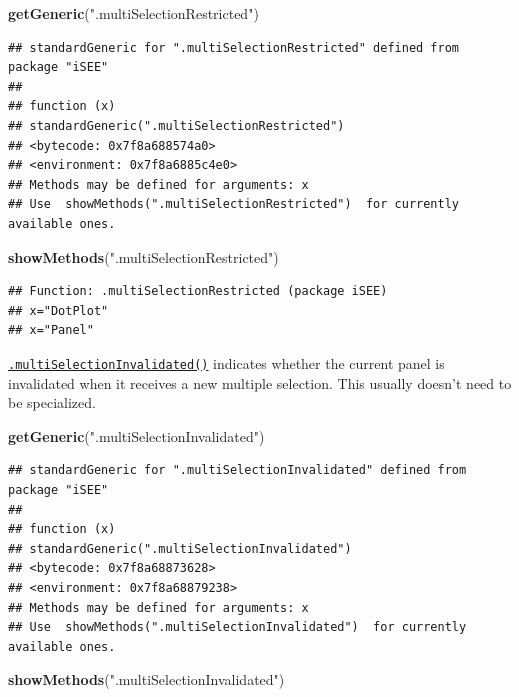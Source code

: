 \documentclass[
]{book}
\newenvironment{Shaded}{\begin{snugshade}}{\end{snugshade}}
\newcommand{\KeywordTok}[1]{\textcolor[rgb]{0.13,0.29,0.53}{\textbf{#1}}}
\newcommand{\NormalTok}[1]{#1}
\newcommand{\StringTok}[1]{\textcolor[rgb]{0.31,0.60,0.02}{#1}}
\begin{document}
\begin{Shaded}
\begin{Highlighting}[]
\KeywordTok{getGeneric}\NormalTok{(}\StringTok{".multiSelectionRestricted"}\NormalTok{)}
\end{Highlighting}
\end{Shaded}

\begin{verbatim}
## standardGeneric for ".multiSelectionRestricted" defined from package "iSEE"
## 
## function (x) 
## standardGeneric(".multiSelectionRestricted")
## <bytecode: 0x7f8a688574a0>
## <environment: 0x7f8a6885c4e0>
## Methods may be defined for arguments: x
## Use  showMethods(".multiSelectionRestricted")  for currently available ones.
\end{verbatim}

\begin{Shaded}
\begin{Highlighting}[]
\KeywordTok{showMethods}\NormalTok{(}\StringTok{".multiSelectionRestricted"}\NormalTok{)}
\end{Highlighting}
\end{Shaded}

\begin{verbatim}
## Function: .multiSelectionRestricted (package iSEE)
## x="DotPlot"
## x="Panel"
\end{verbatim}

\href{https://isee.github.io/iSEE/reference/multi-select-generics.html}{\texttt{.multiSelectionInvalidated()}} indicates whether the current panel is invalidated when it receives a new multiple selection.
This usually doesn't need to be specialized.

\begin{Shaded}
\begin{Highlighting}[]
\KeywordTok{getGeneric}\NormalTok{(}\StringTok{".multiSelectionInvalidated"}\NormalTok{)}
\end{Highlighting}
\end{Shaded}

\begin{verbatim}
## standardGeneric for ".multiSelectionInvalidated" defined from package "iSEE"
## 
## function (x) 
## standardGeneric(".multiSelectionInvalidated")
## <bytecode: 0x7f8a68873628>
## <environment: 0x7f8a68879238>
## Methods may be defined for arguments: x
## Use  showMethods(".multiSelectionInvalidated")  for currently available ones.
\end{verbatim}

\begin{Shaded}
\begin{Highlighting}[]
\KeywordTok{showMethods}\NormalTok{(}\StringTok{".multiSelectionInvalidated"}\NormalTok{)}
\end{Highlighting}
\end{Shaded}
\end{document}
